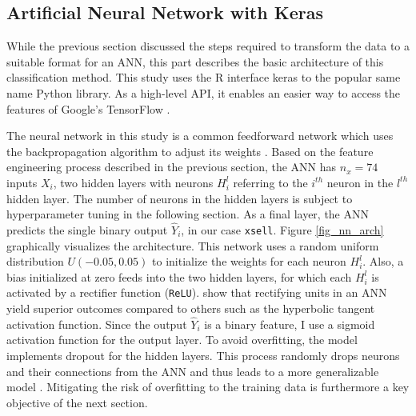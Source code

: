 \documentclass[12pt,a4paper]{article}
\newcommand{\pkg}[1]{{\normalfont\fontseries{b}\selectfont #1}}
\let\proglang=\textsf
\let\code=\texttt
\begin{document}
\subsection{Artificial Neural Network with Keras}

While the previous section discussed the steps required to transform the data to a suitable format for an ANN,
this part describes the basic architecture of this classification method.
This study uses the \proglang{R} interface \pkg{keras} \citep{cholletInterfaceKeras2017} to the popular same name \proglang{Python} library.
As a high-level API, it enables an easier way to access the features of Google's \pkg{TensorFlow} \citep{abadiTensorFlowLargeScaleMachine2015}.

The neural network in this study is a common feedforward network which uses the backpropagation algorithm to adjust its weights \citep{werbosBackpropagationTimeWhat1990}.
Based on the feature engineering process described in the previous section, the ANN has $n_x = 74$ inputs $X_i$, 
two hidden layers with neurons $H_i^l$ referring to the $i^{th}$ neuron in the $l^{th}$ hidden layer. 
The number of neurons in the hidden layers is subject to hyperparameter tuning in the following section.
As a final layer, the ANN predicts the single binary output $\hat{Y}_i$, in our case \code{xsell}.
Figure \ref{fig_nn_arch} graphically visualizes the architecture.
 \label{fig_nn_arch}
This network uses a random uniform distribution $U(-0.05, 0.05)$ to initialize the weights for each neuron $H_i^l$.
Also, a bias initialized at zero feeds into the two hidden layers, for which each $H_i^l$ is activated by a rectifier function (\code{ReLU}).
\cite{glorotDeepSparseRectifier2011} show that rectifying units in an ANN yield superior outcomes compared to others such as the hyperbolic tangent activation function. Since the output $\hat{Y}_i$ is a binary feature, I use a sigmoid activation function for the output layer.
To avoid overfitting, the model implements dropout for the hidden layers.
This process randomly drops neurons and their connections from the ANN and thus leads to a more generalizable model \citep{srivastavaDropoutSimpleWay2014}.
Mitigating the risk of overfitting to the training data is furthermore a key objective of the next section.
\end{document}
